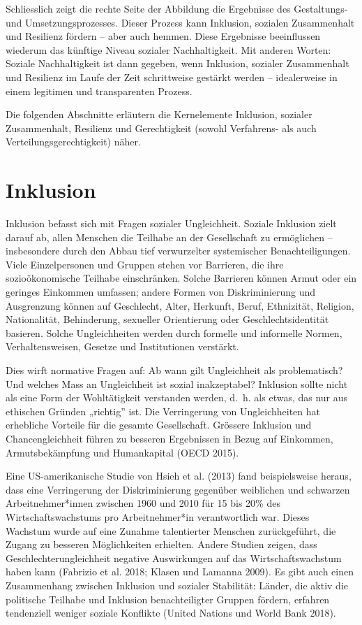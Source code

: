 \documentclass[
  nswissgerman,
  a4paper,
  DIV=11,
  numbers=noendperiod,
  oneside,
  openany]{scrreprt}
\begin{document}
Schliesslich zeigt die rechte Seite der Abbildung die Ergebnisse des
Gestaltungs- und Umsetzungsprozesses. Dieser Prozess kann Inklusion,
sozialen Zusammenhalt und Resilienz fördern -- aber auch hemmen. Diese
Ergebnisse beeinflussen wiederum das künftige Niveau sozialer
Nachhaltigkeit. Mit anderen Worten: Soziale Nachhaltigkeit ist dann
gegeben, wenn Inklusion, sozialer Zusammenhalt und Resilienz im Laufe
der Zeit schrittweise gestärkt werden -- idealerweise in einem legitimen
und transparenten Prozess.

Die folgenden Abschnitte erläutern die Kernelemente Inklusion, sozialer
Zusammenhalt, Resilienz und Gerechtigkeit (sowohl Verfahrens- als auch
Verteilungsgerechtigkeit) näher.

\section{Inklusion}\label{inklusion}

Inklusion befasst sich mit Fragen sozialer Ungleichheit. Soziale
Inklusion zielt darauf ab, allen Menschen die Teilhabe an der
Gesellschaft zu ermöglichen -- insbesondere durch den Abbau tief
verwurzelter systemischer Benachteiligungen. Viele Einzelpersonen und
Gruppen stehen vor Barrieren, die ihre sozioökonomische Teilhabe
einschränken. Solche Barrieren können Armut oder ein geringes Einkommen
umfassen; andere Formen von Diskriminierung und Ausgrenzung können auf
Geschlecht, Alter, Herkunft, Beruf, Ethnizität, Religion, Nationalität,
Behinderung, sexueller Orientierung oder Geschlechtsidentität basieren.
Solche Ungleichheiten werden durch formelle und informelle Normen,
Verhaltensweisen, Gesetze und Institutionen verstärkt.

Dies wirft normative Fragen auf: Ab wann gilt Ungleichheit als
problematisch? Und welches Mass an Ungleichheit ist sozial inakzeptabel?
Inklusion sollte nicht als eine Form der Wohltätigkeit verstanden
werden, d.~h. als etwas, das nur aus ethischen Gründen „richtig'' ist.
Die Verringerung von Ungleichheiten hat erhebliche Vorteile für die
gesamte Gesellschaft. Grössere Inklusion und Chancengleichheit führen zu
besseren Ergebnissen in Bezug auf Einkommen, Armutsbekämpfung und
Humankapital (OECD 2015).

Eine US-amerikanische Studie von Hsieh et al. (2013) fand beispielsweise
heraus, dass eine Verringerung der Diskriminierung gegenüber weiblichen
und schwarzen Arbeitnehmer*innen zwischen 1960 und 2010 für 15 bis 20\%
des Wirtschaftswachstums pro Arbeitnehmer*in verantwortlich war. Dieses
Wachstum wurde auf eine Zunahme talentierter Menschen zurückgeführt, die
Zugang zu besseren Möglichkeiten erhielten. Andere Studien zeigen, dass
Geschlechterungleichheit negative Auswirkungen auf das
Wirtschaftswachstum haben kann (Fabrizio et al. 2018; Klasen und Lamanna
2009). Es gibt auch einen Zusammenhang zwischen Inklusion und sozialer
Stabilität: Länder, die aktiv die politische Teilhabe und Inklusion
benachteiligter Gruppen fördern, erfahren tendenziell weniger soziale
Konflikte (United Nations und World Bank 2018).
\end{document}
